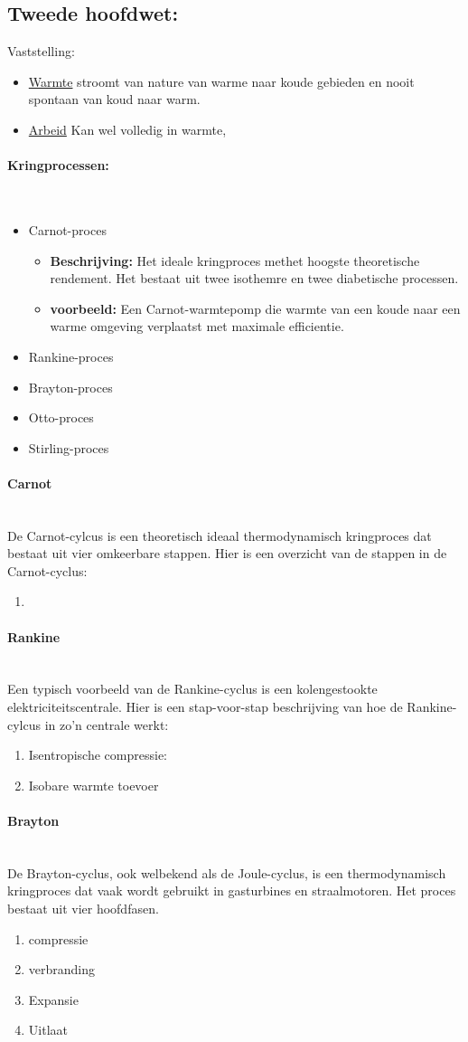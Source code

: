 \documentclass[12pt]{article}
\newcommand{\myparagraph}[1]{\paragraph{#1}\mbox{}\\}
\begin{document}
\subsection{Tweede hoofdwet:}
Vaststelling:\begin{itemize}
    \item \underline{Warmte} stroomt van nature van warme naar koude gebieden en nooit spontaan van koud naar warm.
    \item \underline{Arbeid} Kan wel volledig in warmte, 
\end{itemize}
\myparagraph{Kringprocessen:}
\begin{itemize}
    \item Carnot-proces\begin{itemize}
        \item \textbf{Beschrijving:} Het ideale kringproces methet hoogste theoretische rendement. Het bestaat uit twee isothemre en twee diabetische processen.
        \item \textbf{voorbeeld:} Een Carnot-warmtepomp die warmte van een koude naar een warme omgeving verplaatst met maximale efficientie.
    \end{itemize}
    \item Rankine-proces
    \item Brayton-proces
    \item Otto-proces
    \item Stirling-proces
\end{itemize}
\myparagraph{Carnot}
De Carnot-cylcus is een theoretisch ideaal thermodynamisch kringproces dat bestaat uit vier omkeerbare stappen. Hier is een overzicht van de stappen in de Carnot-cyclus:\begin{enumerate}
    \item %
\end{enumerate}
\myparagraph{Rankine}
Een typisch voorbeeld van de Rankine-cyclus is een kolengestookte elektriciteitscentrale. Hier is een stap-voor-stap beschrijving van hoe de Rankine-cylcus in zo'n centrale werkt:\begin{enumerate}
    \item Isentropische compressie:
    \item Isobare warmte toevoer
\end{enumerate}
\myparagraph{Brayton}
De Brayton-cyclus, ook welbekend als de Joule-cyclus, is een thermodynamisch kringproces dat vaak wordt gebruikt in gasturbines en straalmotoren. Het proces bestaat uit vier hoofdfasen.\begin{enumerate}
    \item compressie
    \item verbranding
    \item Expansie
    \item Uitlaat
\end{enumerate}
\end{document}
